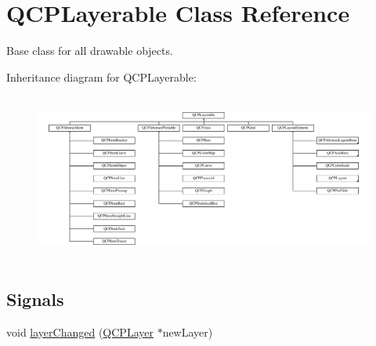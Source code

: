 \hypertarget{classQCPLayerable}{\section{\-Q\-C\-P\-Layerable \-Class \-Reference}
\label{classQCPLayerable}
}


\-Base class for all drawable objects.  


\-Inheritance diagram for \-Q\-C\-P\-Layerable\-:\begin{figure}[H]
\begin{center}
\leavevmode
\includegraphics[height=5.569620cm]{classQCPLayerable}
\end{center}
\end{figure}
\subsection*{\-Signals}
\begin{DoxyCompactItemize}
\item 
void \hyperlink{classQCPLayerable_abbf8657cedea73ac1c3499b521c90eba}{layer\-Changed} (\hyperlink{classQCPLayer}{\-Q\-C\-P\-Layer} $\ast$new\-Layer)
\end{DoxyCompactItemize}
